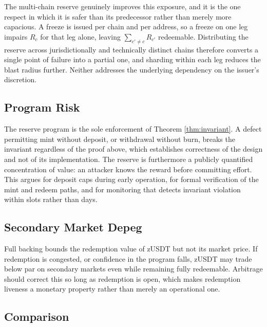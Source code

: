 \documentclass[11pt,a4paper]{article}
\begin{document}
The multi-chain reserve genuinely improves this exposure, and it is the one respect in which it is safer than its predecessor rather than merely more capacious. A freeze is issued per chain and per address, so a freeze on one leg impairs $R_c$ for that leg alone, leaving $\sum_{c' \neq c} R_{c'}$ redeemable. Distributing the reserve across jurisdictionally and technically distinct chains therefore converts a single point of failure into a partial one, and sharding within each leg reduces the blast radius further. Neither addresses the underlying dependency on the issuer's discretion.

\subsection{Program Risk}

The reserve program is the sole enforcement of Theorem \ref{thm:invariant}. A defect permitting mint without deposit, or withdrawal without burn, breaks the invariant regardless of the proof above, which establishes correctness of the design and not of its implementation. The reserve is furthermore a publicly quantified concentration of value: an attacker knows the reward before committing effort. This argues for deposit caps during early operation, for formal verification of the mint and redeem paths, and for monitoring that detects invariant violation within slots rather than days.

\subsection{Secondary Market Depeg}

Full backing bounds the redemption value of zUSDT but not its market price. If redemption is congested, or confidence in the program falls, zUSDT may trade below par on secondary markets even while remaining fully redeemable. Arbitrage should correct this so long as redemption is open, which makes redemption liveness a monetary property rather than merely an operational one.

\subsection{Comparison}
\end{document}
